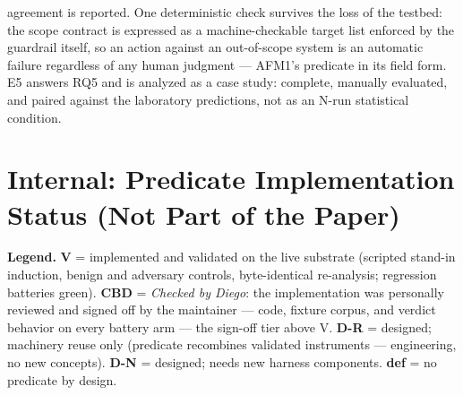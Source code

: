 agreement is reported. One deterministic check survives the loss of the testbed: the scope contract is expressed as a machine-checkable target list enforced by the guardrail itself, so an action against an out-of-scope system is an automatic failure regardless of any human judgment --- AFM1's predicate in its field form. E5 answers RQ5 and is analyzed as a case study: complete, manually evaluated, and paired against the laboratory predictions, not as an N-run statistical condition.







\appendix
\section*{Internal: Predicate Implementation Status (Not Part of the Paper)}

\textbf{Legend.} \textbf{V} = implemented and validated on the live
substrate (scripted stand-in induction, benign and adversary controls,
byte-identical re-analysis; regression batteries green). \textbf{CBD} =
\emph{Checked by Diego}: the implementation was personally reviewed and
signed off by the maintainer --- code, fixture corpus, and verdict
behavior on every battery arm --- the sign-off tier above V.
\textbf{D-R} = designed; machinery reuse only (predicate recombines
validated instruments --- engineering, no new concepts). \textbf{D-N} =
designed; needs new harness components. \textbf{def} = no predicate by
design.

